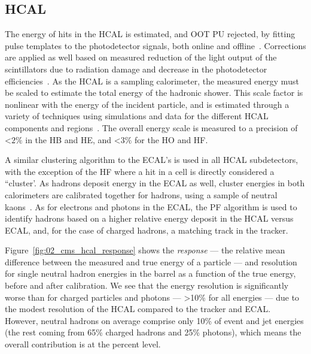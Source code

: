 \subsection{HCAL}

The energy of hits in the HCAL is estimated, and OOT PU rejected, by fitting pulse templates to the photodetector signals, both online and offline~\cite{CMS:2023lqq}.
Corrections are applied as well based on measured reduction of the light output of the scintillators due to radiation damage and decrease in the photodetector efficiencies~\cite{CMS:2019hpr}.
As the HCAL is a sampling calorimeter, the measured energy must be scaled to estimate the total energy of the hadronic shower.
This scale factor is nonlinear with the energy of the incident particle, and is estimated through a variety of techniques using simulations and data for the different HCAL components and regions~\cite{CMS:2019hpr}.
The overall energy scale is measured to a precision of <$2\%$ in the HB and HE, and <$3\%$ for the HO and HF.

A similar clustering algorithm to the ECAL's is used in all HCAL subdetectors, with the exception of the HF where a hit in a cell is directly considered a ``cluster'.
As hadrons deposit energy in the ECAL as well, cluster energies in both calorimeters are calibrated together for hadrons, using a sample of neutral kaons~\cite{CMS:2017yfk}.
As for electrons and photons in the ECAL, the PF algorithm is used to identify hadrons based on a higher relative energy deposit in the HCAL versus ECAL, and, for the case of charged hadrons, a matching track in the tracker.

Figure~\ref{fig:02_cms_hcal_response} shows the \textit{response} --- the relative mean difference between the measured and true energy of a particle --- and resolution for single neutral hadron energies in the barrel as a function of the true energy, before and after calibration.
We see that the energy resolution is significantly worse than for charged particles and photons --- >10\% for all energies --- due to the modest resolution of the HCAL compared to the tracker and ECAL.
However, neutral hadrons on average comprise only 10\% of event and jet energies (the rest coming from 65\% charged hadrons and 25\% photons), which means the overall contribution is at the percent level.

